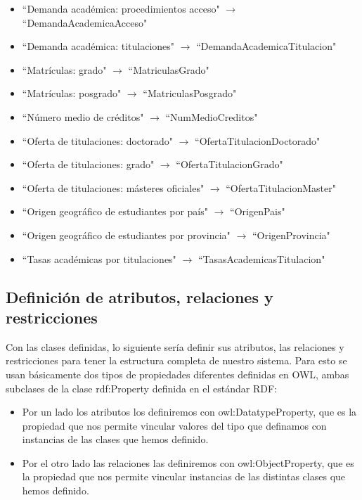 \begin{itemize}
	\item ``Demanda académica: procedimientos acceso"  $\rightarrow$  ``DemandaAcademicaAcceso"
	\item ``Demanda académica: titulaciones"  $\rightarrow$  ``DemandaAcademicaTitulacion"
	\item ``Matrículas: grado"  $\rightarrow$  ``MatriculasGrado"
	\item ``Matrículas: posgrado"  $\rightarrow$  ``MatriculasPosgrado"
	\item ``Número medio de créditos"  $\rightarrow$  ``NumMedioCreditos"
	\item ``Oferta de titulaciones: doctorado"  $\rightarrow$  ``OfertaTitulacionDoctorado"
	\item ``Oferta de titulaciones: grado"  $\rightarrow$  ``OfertaTitulacionGrado"
	\item ``Oferta de titulaciones: másteres oficiales"  $\rightarrow$  ``OfertaTitulacionMaster"
	\item ``Origen geográfico de estudiantes por país"  $\rightarrow$  ``OrigenPais"
	\item ``Origen geográfico de estudiantes por provincia"  $\rightarrow$  ``OrigenProvincia"
	\item ``Tasas académicas por titulaciones"  $\rightarrow$  ``TasasAcademicasTitulacion"
\end{itemize}

\subsection{Definición de atributos, relaciones y restricciones}

Con las clases definidas, lo siguiente sería definir sus atributos, las relaciones y restricciones para tener la estructura completa de nuestro sistema. Para esto se usan básicamente dos tipos de propiedades diferentes definidas en OWL, ambas subclases de la clase rdf:Property definida en el estándar RDF:

\begin{itemize}
	\item Por un lado los atributos los definiremos con owl:DatatypeProperty, que es la propiedad que nos permite vincular valores del tipo que definamos con instancias de las clases que hemos definido.
	\item Por el otro lado las relaciones las definiremos con owl:ObjectProperty, que es la propiedad que nos permite vincular instancias de las distintas clases que hemos definido.
\end{itemize}


